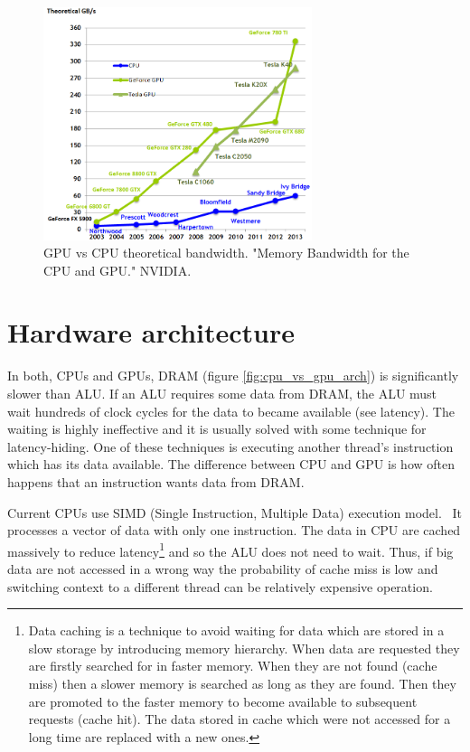 \documentclass[12pt,oneside]{fithesis2}
\begin{document}
\begin{figure}[H]
	\centering
	\includegraphics[width=0.7\textwidth]{figures/memory-bandwidth.png}
	\caption{GPU vs CPU theoretical bandwidth. "Memory Bandwidth for the CPU and GPU." NVIDIA.~\cite{cuda_guide}}
	\label{fig:gpu_bandwith}
\end{figure}

\section{Hardware architecture}
\label{cuda_architecture}

In both, CPUs and GPUs, DRAM (figure \ref{fig:cpu_vs_gpu_arch}) is significantly slower than ALU. If an ALU requires some data from DRAM, the ALU must wait hundreds of clock cycles for the data to became available (see latency). The waiting is highly ineffective and it is usually solved with some technique for latency-hiding. One of these techniques is executing another thread's instruction which has its data available. The difference between CPU and GPU is how often happens that an instruction wants data from DRAM.

Current CPUs use SIMD (Single Instruction, Multiple Data) execution model.~\cite{professional_cuda} It processes a vector of data with only one instruction. The data in CPU are cached massively to reduce latency\footnote{Data caching is a technique to avoid waiting for data which are stored in a slow storage by introducing memory hierarchy. When data are requested they are firstly searched for in faster memory. When they are not found (cache miss) then a slower memory is searched as long as they are found. Then they are promoted to the faster memory to become available to subsequent requests (cache hit). The data stored in cache which were not accessed for a long time are replaced with a new ones.} and so the ALU does not need to wait. Thus, if big data are not accessed in a wrong way the probability of cache miss is low and switching context to a different thread can be relatively expensive operation.
\end{document}

